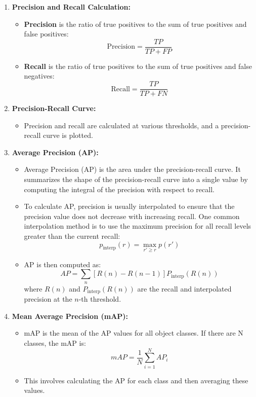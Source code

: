 \documentclass[conference]{IEEEtran}
\begin{document}
\begin{enumerate}
  \item \textbf{Precision and Recall Calculation:}
        \begin{itemize}
          \item \textbf{Precision} is the ratio of true positives to the sum of true positives and false positives:
                \[
                  \text{Precision} = \frac{TP}{TP + FP}
                \]
          \item \textbf{Recall} is the ratio of true positives to the sum of true positives and false negatives:
                \[
                  \text{Recall} = \frac{TP}{TP + FN}
                \]
        \end{itemize}

  \item \textbf{Precision-Recall Curve:}
        \begin{itemize}
          \item Precision and recall are calculated at various thresholds, and a precision-recall curve is plotted.
        \end{itemize}

  \item \textbf{Average Precision (AP):}
        \begin{itemize}
          \item Average Precision (AP) is the area under the precision-recall curve. It summarizes the shape of the precision-recall curve into a single value by computing the integral of the precision with respect to recall.
          \item To calculate AP, precision is usually interpolated to ensure that the precision value does not decrease with increasing recall. One common interpolation method is to use the maximum precision for all recall levels greater than the current recall:
                \[
                  p_{\text{interp}}(r) = \max_{r' \geq r} p(r')
                \]
          \item AP is then computed as:
                \[
                  AP = \sum_n [R(n) - R(n-1)] P_{\text{interp}} (R(n))
                \]
                where \(R(n)\) and \(P_{\text{interp}}(R(n))\) are the recall and interpolated precision at the \(n\)-th threshold.
        \end{itemize}

  \item \textbf{Mean Average Precision (mAP):}
        \begin{itemize}
          \item mAP is the mean of the AP values for all object classes. If there are N classes, the
                mAP is:
                \[
                  mAP = \frac{1}{N} \sum_{i=1}^{N} AP_i
                \]
          \item This involves calculating the AP for each class and then averaging these values.
        \end{itemize}
\end{enumerate}
\end{document}

